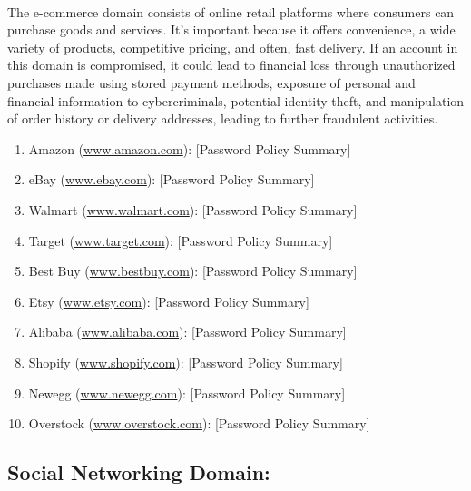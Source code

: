 \documentclass{article}
\begin{document}
\paragraph{} The e-commerce domain consists of online retail platforms where consumers can purchase goods and services. It's important because it offers convenience, a wide variety of products, competitive pricing, and often, fast delivery. If an account in this domain is compromised, it could lead to financial loss through unauthorized purchases made using stored payment methods, exposure of personal and financial information to cybercriminals, potential identity theft, and manipulation of order history or delivery addresses, leading to further fraudulent activities.
\begin{enumerate}
    \item Amazon (\url{www.amazon.com}): [Password Policy Summary]
    \item eBay (\url{www.ebay.com}): [Password Policy Summary]
    \item Walmart (\url{www.walmart.com}): [Password Policy Summary]
    \item Target (\url{www.target.com}): [Password Policy Summary]
    \item Best Buy (\url{www.bestbuy.com}): [Password Policy Summary]
    \item Etsy (\url{www.etsy.com}): [Password Policy Summary]
    \item Alibaba (\url{www.alibaba.com}): [Password Policy Summary]
    \item Shopify (\url{www.shopify.com}): [Password Policy Summary]
    \item Newegg (\url{www.newegg.com}): [Password Policy Summary]
    \item Overstock (\url{www.overstock.com}): [Password Policy Summary]
\end{enumerate}

\subsection*{Social Networking Domain:}
\end{document}
